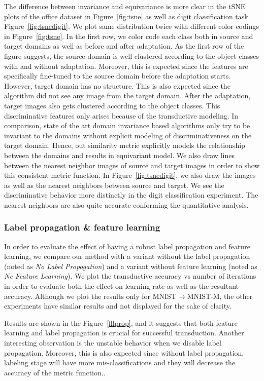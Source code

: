 The difference between invariance and equivariance is more clear in the tSNE plots of the office dataset in Figure~\ref{fig:tsne} as well as digit classification task Figure~\ref{fig:tsnedigit}. We plot same distribution twice with different color codings in Figure~\ref{fig:tsne}. In the first row, we color code each class both in source and target domains as well as before and after adaptation. As the first row of the figure suggests, the source domain is well clustered according to the object classes with and without adaptation. Moreover, this is expected since the features are specifically fine-tuned to the source domain before the adaptation starts. However, target domain has no structure. This is also expected since the algorithm did not see any image from the target domain. After the adaptation, target images also gets clustered according to the object classes. This discriminative features only arises because of the transductive modeling. In comparison, state of the art domain invariance based algorithms only try to be invariant to the domains without explicit modeling of discriminativeness on the target domain. Hence, out similarity metric explicitly models the relationship between the domains and results in equivariant model. We also draw lines between the nearest neighbor images of source and target images in order to show this consistent metric function. In Figure~\ref{fig:tsnedigit}, we also draw the images as well as the nearest neighbors between source and target. We see the discriminative behavior more distinctly in the digit classification experiment. The nearest neighbors are also quite accurate conforming the quantitative analysis. 



\subsubsection{Label propagation \& feature learning}
In order to evaluate the effect of having a robust label propagation and feature learning, we compare our method with a variant without the label propagation (noted as \emph{No Label Propogation}) and a variant without feature learning (noted as \emph{Ne Feature Learning}). We plot the transductive accuracy vs number of iterations in order to evaluate both the effect on learning rate as well as the resultant accuracy. Although we plot the results only for MNIST$\rightarrow$MNIST-M, the other experiments have similar results and not displayed for the sake of clarity. 

Results are shown in the Figure~\ref{fllprop}, and it suggests that both feature learning and label propagation is crucial for successful transduction. Another interesting observation is the unstable behavior when we disable label propagation. Moreover, this is also expected since without label propagation, labeling stage will have more mis-classifications and they will decrease the accuracy of the metric function..

